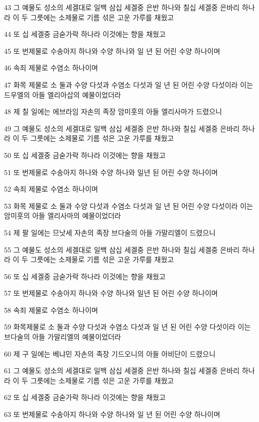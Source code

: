 \par 43 그 예물도 성소의 세겔대로 일백 삼십 세겔중 은반 하나와 칠십 세겔중 은바리 하나라 이 두 그릇에는 소제물로 기름 섞은 고운 가루를 채웠고
\par 44 또 십 세겔중 금숟가락 하나라 이것에는 향을 채웠고
\par 45 또 번제물로 수송아지 하나와 수양 하나와 일 년 된 어린 수양 하나이며
\par 46 속죄 제물로 수염소 하나이며
\par 47 화목 제물로 소 둘과 수양 다섯과 수염소 다섯과 일 년 된 어린 수양 다섯이라 이는 드우엘의 아들 엘리아삽의 예물이었더라
\par 48 제 칠 일에는 에브라임 자손의 족장 암미훗의 아들 엘리사마가 드렸으니
\par 49 그 예물도 성소의 세겔대로 일백 삼십 세겔중 은반 하나와 칠십 세겔중 은바리 하나라 이 두 그릇에는 소제물로 기름 섞은 고운 가루를 채웠고
\par 50 또 십 세겔중 금숟가락 하나라 이것에는 향을 채웠고
\par 51 또 번제물로 수송아지 하나와 수양 하나와 일년 된 어린 수양 하나이며
\par 52 속죄 제물로 수염소 하나이며
\par 53 화목 제물로 소 둘과 수양 다섯과 수염소 다섯과 일 년 된 어린 수양 다섯이라 이는 암미훗의 아들 엘리사마의 예물이었더라
\par 54 제 팔 일에는 므낫세 자손의 족장 브다술의 아들 가말리엘이 드렸으니
\par 55 그 예물도 성소의 세겔대로 일백 삼십 세겔중 은반 하나와 칠십 세겔중 은바리 하나라 이 두 그릇에는 소제물로 기름 섞은 고운 가루를 채웠고
\par 56 또 십 세겔중 금숟가락 하나라 이것에는 향을 채웠고
\par 57 또 번제물로 수송아지 하나와 수양 하나와 일년 된 어린 수양 하나이며
\par 58 속죄 제물로 수염소 하나이며
\par 59 화목제물로 소 둘과 수양 다섯과 수염소 다섯과 일 년 된 어린 수양 다섯이라 이는 브다술의 아들 가말리엘의 예물이었더라
\par 60 제 구 일에는 베냐민 자손의 족장 기드오니의 아들 아비단이 드렸으니
\par 61 그 예물도 성소의 세겔대로 일백 삼십 세겔중 은반 하나와 칠십 세겔중 은바리 하나라 이 두 그릇에는 소제물로 기름 섞은 고운 가루를 채웠고
\par 62 또 십 세겔중 금숟가락 하나라 이것에는 향을 채웠고
\par 63 또 번제물로 수송아지 하나와 수양 하나와 일 년 된 어린 수양 하나이며
